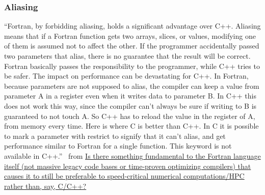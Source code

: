 \documentclass{beamer}
\begin{document}
\begin{darkframes}
  \begin{frame}[label=aliasing]
    \frametitle{Aliasing}
    \footnotesize{``Fortran, by forbidding aliasing, holds a significant advantage over C++. Aliasing means that if a Fortran function gets two arrays, slices, or values, modifying one of them is assumed not to affect the other. If the programmer accidentally passed two parameters that alias, there is no guarantee that the result will be correct. Fortran basically passes the responsibility to the programmer, while C++ tries to be safer. The impact on performance can be devastating for C++. In Fortran, because parameters are not supposed to alias, the compiler can keep a value from parameter A in a register even when it writes data to parameter B. In C++ this does not work this way, since the compiler can’t always be sure if writing to B is guaranteed to not touch A. So C++ has to reload the value in the register of A, from memory every time. Here is where C is better than C++. In C it is possible to mark a parameter with restrict to signify that it can’t alias, and get performance similar to Fortran for a single function. This keyword is not available in C++.''}
    \vfill
    \textemdash\ from \href{https://www.quora.com/Is-there-something-fundamental-to-the-Fortran-language-itself-not-massive-legacy-code-bases-or-time-proven-optimizing-compilers-that-causes-it-to-still-be-preferable-to-speed-critical-numerical-computations-HPC}{Is there something fundamental to the Fortran language itself (not massive legacy code bases or time-proven optimizing compilers) that causes it to still be preferable to speed-critical numerical computations/HPC rather than, say, C/C++?}

    \hyperlink{features}{}
    \addtocounter{framenumber}{-1}
  \end{frame}
   
\end{darkframes}
\end{document}
